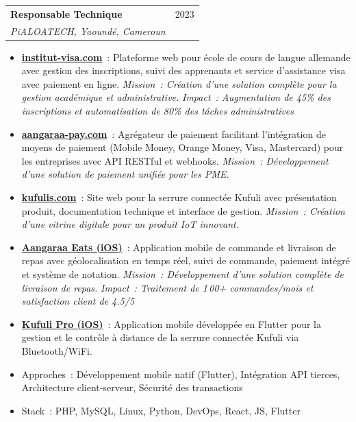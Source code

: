 \documentclass[12pt, a4paper]{article}
\begin{document}
\vspace{6pt}
\noindent\begin{tabularx}{\linewidth}{@{}X r@{}}
  {\bfseries\color{primary}Responsable Technique} &
  {\small\textcolor{textgray}{2023}} \\
  {\itshape\color{textgray}PiALOATECH, Yaound\'e, Cameroun} & \\
\end{tabularx}
\begin{itemize}[leftmargin=1.4em, itemsep=1pt, topsep=2pt, parsep=0pt]
  \item \href{https://institut-visa.com/}{\textbf{institut-visa.com}}~: Plateforme web pour \'ecole de cours de langue allemande avec gestion des inscriptions, suivi des apprenants et service d'assistance visa avec paiement en ligne. \textit{Mission~: Cr\'eation d'une solution compl\`ete pour la gestion acad\'emique et administrative.} \textit{Impact~: Augmentation de 45\% des inscriptions et automatisation de 80\% des t\'aches administratives}
  \item \href{https://aangaraa-pay.com/}{\textbf{aangaraa-pay.com}}~: Agr\'egateur de paiement facilitant l'int\'egration de moyens de paiement (Mobile Money, Orange Money, Visa, Mastercard) pour les entreprises avec API RESTful et webhooks. \textit{Mission~: D\'eveloppement d'une solution de paiement unifi\'ee pour les PME.}
  \item \href{https://kufulis.com/}{\textbf{kufulis.com}}~: Site web pour la serrure connect\'ee Kufuli avec pr\'esentation produit, documentation technique et interface de gestion. \textit{Mission~: Cr\'eation d'une vitrine digitale pour un produit IoT innovant.}
  \item \href{https://apps.apple.com/us/app/aangaraa-eats/id6444290900}{\textbf{Aangaraa Eats (iOS)}}~: Application mobile de commande et livraison de repas avec g\'eolocalisation en temps r\'eel, suivi de commande, paiement int\'egr\'e et syst\`eme de notation. \textit{Mission~: D\'eveloppement d'une solution compl\`ete de livraison de repas.} \textit{Impact~: Traitement de 1\,00+ commandes/mois et satisfaction client de 4.5/5}
  \item \href{https://apps.apple.com/us/app/kufuli-pro/id1628880922}{\textbf{Kufuli Pro (iOS)}}~: Application mobile d\'evelopp\'ee en Flutter pour la gestion et le contr\^ole \`a distance de la serrure connect\'ee Kufuli via Bluetooth/WiFi.
  \item Approches~: D\'eveloppement mobile natif (Flutter), Int\'egration API tierces, Architecture client-serveur, S\'ecurit\'e des transactions
  \item Stack~: PHP, MySQL, Linux, Python, DevOps, React, JS, Flutter
\end{itemize}
\end{document}
